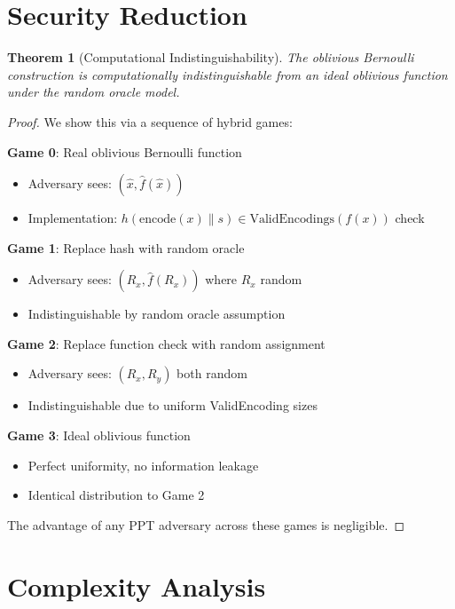 \documentclass[11pt]{article}
\newtheorem{theorem}{Theorem}[section]
\newcommand{\Obv}[1]{\widehat{#1}}
\newcommand{\ValidEnc}[1]{\text{ValidEncodings}(#1)}
\newcommand{\Encode}[1]{\text{encode}(#1)}
\newcommand{\Hash}[1]{h(#1)}
\begin{document}
\section{Security Reduction}

\begin{theorem}[Computational Indistinguishability]
The oblivious Bernoulli construction is computationally indistinguishable from an ideal oblivious function under the random oracle model.
\end{theorem}

\begin{proof}
We show this via a sequence of hybrid games:

\textbf{Game 0}: Real oblivious Bernoulli function
\begin{itemize}
    \item Adversary sees: $(\Obv{x}, \Obv{f}(\Obv{x}))$
    \item Implementation: $\Hash{\Encode{x} \| s} \in \ValidEnc{f(x)}$ check
\end{itemize}

\textbf{Game 1}: Replace hash with random oracle
\begin{itemize}
    \item Adversary sees: $(R_x, \Obv{f}(R_x))$ where $R_x$ random
    \item Indistinguishable by random oracle assumption
\end{itemize}

\textbf{Game 2}: Replace function check with random assignment
\begin{itemize}
    \item Adversary sees: $(R_x, R_y)$ both random
    \item Indistinguishable due to uniform ValidEncoding sizes
\end{itemize}

\textbf{Game 3}: Ideal oblivious function
\begin{itemize}
    \item Perfect uniformity, no information leakage
    \item Identical distribution to Game 2
\end{itemize}

The advantage of any PPT adversary across these games is negligible.
\end{proof}

\section{Complexity Analysis}
\end{document}
